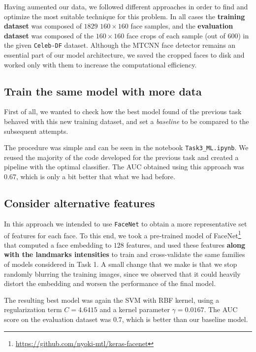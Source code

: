 \documentclass[11pt]{article}
\begin{document}
Having aumented our data, we followed different approaches in order to find and optimize the most suitable technique for this problem. In all cases the \textbf{training dataset} was composed of \( 1829 \) \( 160\times 160 \) face samples, and the \textbf{evaluation dataset} was composed of the \( 160 \times 160 \) face crops of each sample (out of 600) in the given \texttt{Celeb-DF} dataset. Although the MTCNN face detector remains an essential part of our model architecture, we saved the cropped faces to disk and worked only with them to increase the computational efficiency.

\subsection*{Train the same model with more data}

First of all, we wanted to check how the best model found of the previous task behaved with this new training dataset, and set a \emph{baseline} to be compared to the subsequent attempts.

The procedure was simple and can be seen in the notebook \texttt{Task3\_ML.ipynb}. We reused the majority of the code developed for the previous task and created a pipeline with the optimal classifier. The AUC obtained using this approach was 0.67, which is only a bit better that what we had before.

\subsection*{Consider alternative features}

In this approach we intended to use \texttt{FaceNet} \citep{Schroff_2015} to obtain a more representative set of features for each face. To this end, we took a pre-trained model of FaceNet\footnote{\url{https://github.com/nyoki-mtl/keras-facenet}} that computed a face embedding to \( 128 \) features, and used these features \textbf{along with the landmarks intensities} to train and cross-validate the same families of models considered in Task 1. A small change that we make is that we stop randomly blurring the training images, since we observed that it could heavily distort the embedding and worsen the performance of the final model.

The resulting best model was again the SVM with RBF kernel, using a regularization term \( C = 4.6415 \) and a kernel parameter \( \gamma = 0.0167 \). The AUC score on the evaluation dataset was \( 0.7 \), which is better than our baseline model.
\end{document}
